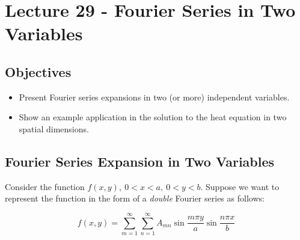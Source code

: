 \chapter{Lecture 29 - Fourier Series in Two Variables}
\label{ch:lec29}
\section{Objectives}
\begin{itemize}
\item Present Fourier series expansions in two (or more) independent variables.
\item Show an example application in the solution to the heat equation in two spatial dimensions.
\end{itemize}
\setcounter{lstannotation}{0}

\section{Fourier Series Expansion in Two Variables}

Consider the function $f(x,y), \ 0<x<a, \ 0<y<b$.  Suppose we want to represent the function in the form of a \emph{double} Fourier series as follows:

\begin{equation}
f(x,y) = \sum\limits_{m=1}^{\infty}\sum\limits_{n=1}^{\infty} A_{mn}\sin{\frac{m\pi y}{a}} \sin{\frac{n \pi x}{b}}
\label{eq:double-fourier}
\end{equation}

